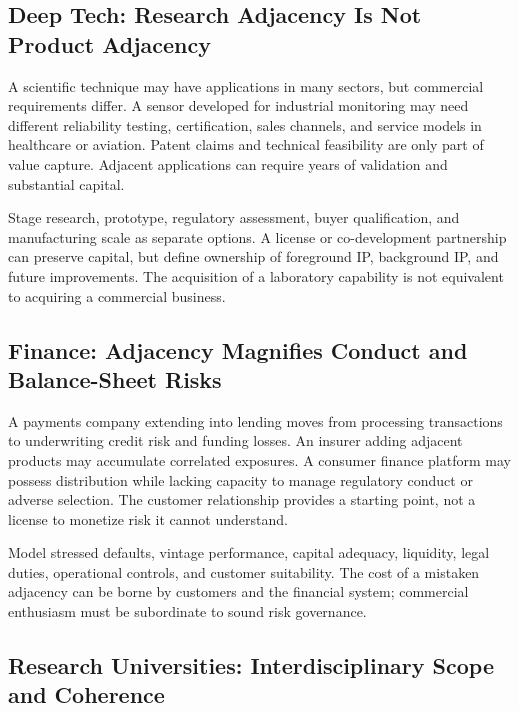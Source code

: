 \subsection{Deep Tech: Research Adjacency Is Not Product Adjacency}
\label{sec:deep_tech_research_vs_product_adjacency}

A scientific technique may have applications in many sectors, but commercial requirements differ. A sensor developed for industrial monitoring may need different reliability testing, certification, sales channels, and service models in healthcare or aviation. Patent claims and technical feasibility are only part of value capture. Adjacent applications can require years of validation and substantial capital.

Stage research, prototype, regulatory assessment, buyer qualification, and manufacturing scale as separate options. A license or co-development partnership can preserve capital, but define ownership of foreground IP, background IP, and future improvements. The acquisition of a laboratory capability is not equivalent to acquiring a commercial business.

\subsection{Finance: Adjacency Magnifies Conduct and Balance-Sheet Risks}
\label{sec:finance_adjacency_magnifies_risks}

A payments company extending into lending moves from processing transactions to underwriting credit risk and funding losses. An insurer adding adjacent products may accumulate correlated exposures. A consumer finance platform may possess distribution while lacking capacity to manage regulatory conduct or adverse selection. The customer relationship provides a starting point, not a license to monetize risk it cannot understand.

Model stressed defaults, vintage performance, capital adequacy, liquidity, legal duties, operational controls, and customer suitability. The cost of a mistaken adjacency can be borne by customers and the financial system; commercial enthusiasm must be subordinate to sound risk governance.

\subsection{Research Universities: Interdisciplinary Scope and Coherence}
\label{sec:research_universities_interdisciplinary_scope}

